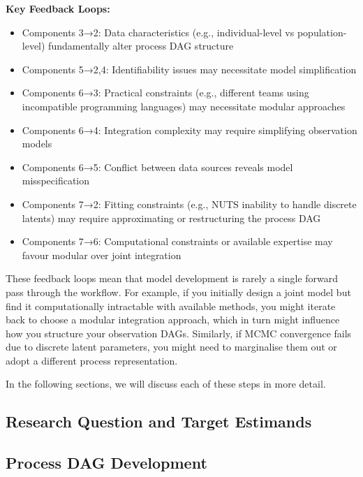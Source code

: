 \documentclass{article}
\begin{document}
\textbf{Key Feedback Loops:}
\begin{itemize}
    \item Components 3→2: Data characteristics (e.g., individual-level vs population-level) fundamentally alter process DAG structure
    \item Components 5→2,4: Identifiability issues may necessitate model simplification
    \item Components 6→3: Practical constraints (e.g., different teams using incompatible programming languages) may necessitate modular approaches
    \item Components 6→4: Integration complexity may require simplifying observation models
    \item Components 6→5: Conflict between data sources reveals model misspecification
    \item Components 7→2: Fitting constraints (e.g., NUTS inability to handle discrete latents) may require approximating or restructuring the process DAG
    \item Components 7→6: Computational constraints or available expertise may favour modular over joint integration
\end{itemize}

These feedback loops mean that model development is rarely a single forward pass through the workflow. For example, if you initially design a joint model but find it computationally intractable with available methods, you might iterate back to choose a modular integration approach, which in turn might influence how you structure your observation DAGs.
Similarly, if MCMC convergence fails due to discrete latent parameters, you might need to marginalise them out or adopt a different process representation.

In the following sections, we will discuss each of these steps in more detail.

\subsection{Research Question and Target Estimands}

\subsection{Process DAG Development}
\end{document}
